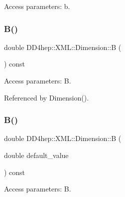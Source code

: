 Access parameters\+: b. 

\hypertarget{struct_d_d4hep_1_1_x_m_l_1_1_dimension_a712d20cdc9cb1b86f8531e313484dacd}{}\label{struct_d_d4hep_1_1_x_m_l_1_1_dimension_a712d20cdc9cb1b86f8531e313484dacd} 
\subsubsection{\texorpdfstring{B()}{B()}\hspace{0.1cm}{\footnotesize\ttfamily [1/2]}}
{\footnotesize\ttfamily double D\+D4hep\+::\+X\+M\+L\+::\+Dimension\+::B (\begin{DoxyParamCaption}{ }\end{DoxyParamCaption}) const}



Access parameters\+: B. 



Referenced by Dimension().

\hypertarget{struct_d_d4hep_1_1_x_m_l_1_1_dimension_a8bdc27a9e047f44daaf1a753541326ac}{}\label{struct_d_d4hep_1_1_x_m_l_1_1_dimension_a8bdc27a9e047f44daaf1a753541326ac} 
\subsubsection{\texorpdfstring{B()}{B()}\hspace{0.1cm}{\footnotesize\ttfamily [2/2]}}
{\footnotesize\ttfamily double D\+D4hep\+::\+X\+M\+L\+::\+Dimension\+::B (\begin{DoxyParamCaption}\item[{double}]{default\+\_\+value }\end{DoxyParamCaption}) const}



Access parameters\+: B. 

\hypertarget{struct_d_d4hep_1_1_x_m_l_1_1_dimension_a79feab35d6321d0c003b6f170d4710c8}{}\label{struct_d_d4hep_1_1_x_m_l_1_1_dimension_a79feab35d6321d0c003b6f170d4710c8} 
